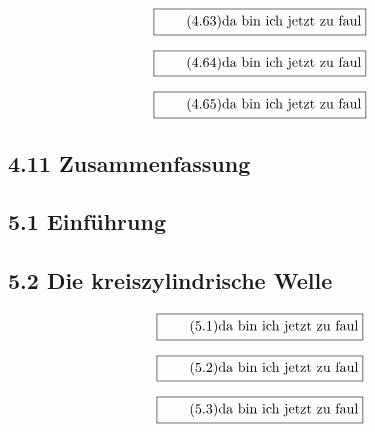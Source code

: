 \documentclass[11pt]{article}
\newcommand{\1}{ {\mathds{1}} }
\begin{document}
    \begin{equation}
      \boxed{
        \tag{4.63}
        \begin{split}
          \text{da bin ich jetzt zu faul}
        \end{split}
      }
    \end{equation}

    \begin{equation}
      \boxed{
        \tag{4.64}
        \begin{split}
          \text{da bin ich jetzt zu faul}
        \end{split}
      }
    \end{equation}

    \begin{equation}
      \boxed{
        \tag{4.65}
        \begin{split}
          \text{da bin ich jetzt zu faul}
        \end{split}
      }
    \end{equation}

    \subsection*{4.11 Zusammenfassung}
	
    \subsection*{5.1 Einführung}
    \subsection*{5.2 Die kreiszylindrische Welle}

    \begin{equation}
      \boxed{
        \tag{5.1}
        \begin{split}
          \text{da bin ich jetzt zu faul}
        \end{split}
      }
    \end{equation}
    
    \begin{equation}
      \boxed{
        \tag{5.2}
        \begin{split}
          \text{da bin ich jetzt zu faul}
        \end{split}
      }
    \end{equation}

    \begin{equation}
      \boxed{
        \tag{5.3}
        \begin{split}
          \text{da bin ich jetzt zu faul}
        \end{split}
      }
    \end{equation}
\end{document}
